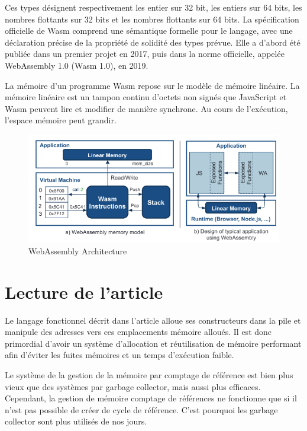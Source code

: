 \documentclass{rapportECL}
\begin{document}
Ces types désignent respectivement les entier sur 32 bit, les entiers sur 64 bits, les nombres flottants sur 32 bits et les nombres 
flottants sur 64 bits.
La spécification officielle de Wasm comprend une sémantique formelle pour le langage, 
avec une déclaration précise de la propriété de solidité des types prévue. 
Elle a d'abord été publiée dans un premier projet en 2017, puis dans la norme officielle, appelée WebAssembly 1.0 (Wasm 1.0), en 2019.
\par La mémoire d’un programme Wasm repose sur le modèle de mémoire linéaire\cite{haas_bringing_2017}. 
La mémoire linéaire est un tampon continu d'octets non signés  que JavaScript et Wasm peuvent lire et modifier de manière synchrone. 
Au cours de l’exécution, l’espace mémoire peut grandir. 

\begin{figure}[ht]
	\centering
	\includegraphics[scale=0.55]{logos/model_memory_wasm.png}	
	\caption{WebAssembly Architecture \cite{noauthor_wasmati_nodate}}
\end{figure}
\FloatBarrier 



\section{Lecture de l'article} \label{section:article}
Le langage fonctionnel décrit dans l'article\cite{ullrich_counting_2020} alloue ses constructeurs dans la pile et manipule des 
adresses vers ces emplacements mémoire alloués. Il est donc primordial d'avoir un système d'allocation et réutilisation de 
mémoire performant afin d'éviter les fuites mémoires et un temps d'exécution faible.

Le système de la gestion de la mémoire par comptage de référence est bien plus vieux que des systèmes par garbage collector, 
mais aussi plus efficaces\cite{ullrich_counting_2020}. Cependant, la gestion de mémoire comptage de références ne fonctionne que si 
il n'est pas possible de créer de cycle de référence. 
C'est pourquoi les garbage collector sont plus utilisés de nos jours.
\end{document}
